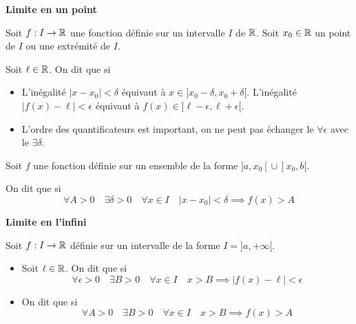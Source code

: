 \documentclass[10pt,class=article,crop=false]{standalone}
\begin{document}
\begin{multicols}{2}
\textbf{Limite en un point}

Soit $f:I\to\mathbb{R}$ une fonction définie sur un intervalle $I$ de $\mathbb{R}$.
Soit $x_0\in\mathbb{R}$ un point de $I$ ou une extrémité de $I$.

\begin{definition}
	Soit $\ell\in\mathbb{R}$. On dit que  si
\end{definition}




\begin{itemize}
	\item L'inégalité $\vert x-x_0\vert <\delta$ équivaut à $x \in {}]x_0 - \delta, x_0+\delta[$.
	L'inégalité $\vert f(x)-\ell\vert <\epsilon$ équivaut à $f(x) \in {}]\ell - \epsilon, \ell+\epsilon[$.
	
	\item L'ordre des quantificateurs est important, on ne peut pas échanger le $\forall \epsilon$ avec le $\exists \delta$.
\end{itemize}


Soit $f$ une fonction définie sur un ensemble de la forme $]a,x_0[{} \cup  {}]x_0,b[$.
\begin{definition}
	On dit que  si
	\[
	\forall A>0 \quad \exists \delta>0 \quad \forall x\in I \quad \vert x-x_0\vert <\delta \implies f(x)>A
	\]
\end{definition}


\textbf{Limite en l'infini}

Soit $f:I\to \mathbb{R}$ définie sur un intervalle de la forme $I={}]a,+\infty[$.

\begin{definition}
	\sauteligne
	\begin{itemize}
		\item Soit $\ell\in\mathbb{R}$. On dit que  si
		\[
		\forall \epsilon>0 \quad \exists B>0 \quad \forall x\in I \quad x>B \implies \vert f(x)-\ell\vert <\epsilon
		\]

		\item On dit que  si
		\[
		\forall A>0 \quad \exists B>0 \quad \forall x\in I \quad x>B \implies  f(x)>A
		\]


\end{itemize}
\end{definition}
\end{multicols}
\end{document}
